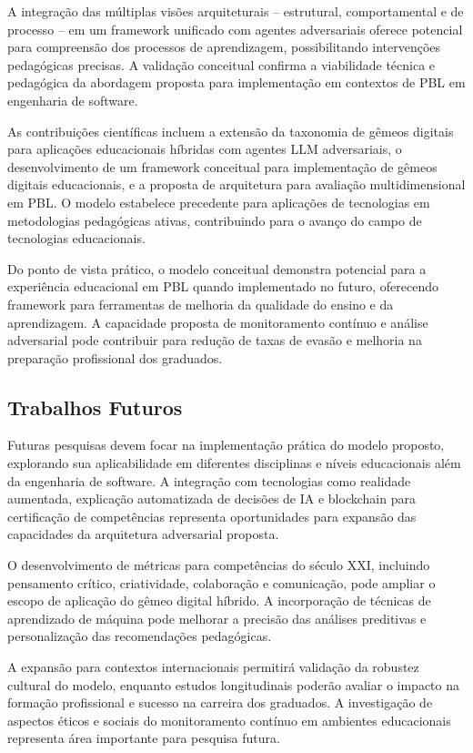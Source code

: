 \documentclass[english, spanish, brazilian]{modelo_dt}
\begin{document}
A integração das múltiplas visões arquiteturais -- estrutural, comportamental e de
processo -- em um framework unificado com agentes adversariais oferece
potencial para compreensão dos processos de aprendizagem, possibilitando
intervenções pedagógicas precisas\@. A validação conceitual confirma a
viabilidade técnica e pedagógica da abordagem proposta para implementação em
contextos de PBL em engenharia de software\@.

As contribuições científicas incluem a extensão da taxonomia de gêmeos digitais
para aplicações educacionais híbridas com agentes LLM adversariais, o
desenvolvimento de um framework conceitual para implementação de gêmeos
digitais educacionais, e a proposta de arquitetura para avaliação
multidimensional em PBL\@. O modelo estabelece precedente para aplicações de
tecnologias em metodologias pedagógicas ativas, contribuindo para o avanço do
campo de tecnologias educacionais\@.

Do ponto de vista prático, o modelo conceitual demonstra potencial para a
experiência educacional em PBL quando implementado no futuro, oferecendo
framework para ferramentas de melhoria da qualidade do ensino e da
aprendizagem\@. A capacidade proposta de monitoramento contínuo e análise
adversarial pode contribuir para redução de taxas de evasão e melhoria na
preparação profissional dos graduados\@.

\subsection{Trabalhos Futuros}

Futuras pesquisas devem focar na implementação prática do modelo proposto,
explorando sua aplicabilidade em diferentes disciplinas e níveis educacionais
além da engenharia de software\@. A integração com tecnologias como realidade
aumentada, explicação automatizada de decisões de IA e blockchain para
certificação de competências representa oportunidades para expansão das
capacidades da arquitetura adversarial proposta\@.

O desenvolvimento de métricas para competências do século XXI, incluindo
pensamento crítico, criatividade, colaboração e comunicação, pode ampliar o
escopo de aplicação do gêmeo digital híbrido\@. A incorporação de técnicas de
aprendizado de máquina pode melhorar a precisão das análises preditivas e
personalização das recomendações pedagógicas\@.

A expansão para contextos internacionais permitirá validação da robustez
cultural do modelo, enquanto estudos longitudinais poderão avaliar o impacto na
formação profissional e sucesso na carreira dos graduados\@. A investigação de
aspectos éticos e sociais do monitoramento contínuo em ambientes educacionais
representa área importante para pesquisa futura\@.
\end{document}
